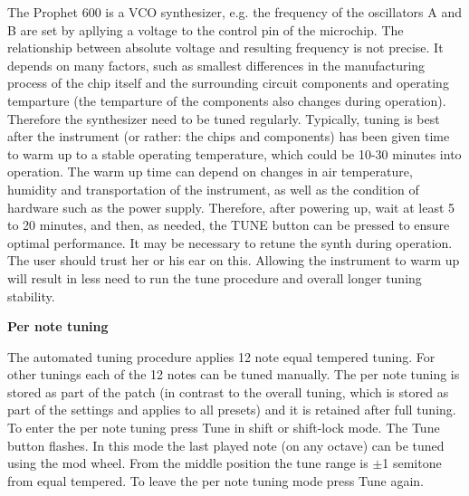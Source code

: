 The Prophet 600 is a VCO synthesizer, e.g. the frequency of the oscillators A and B are set by apllying a voltage to the control pin of the microchip. The relationship between absolute voltage and resulting frequency is not precise. It depends on many factors, such as smallest differences in the manufacturing process of the chip itself and the surrounding circuit components and operating temparture (the temparture of the components also changes during operation). Therefore the synthesizer need to be tuned regularly. Typically, tuning is best after the instrument (or rather: the chips and components) has been given time to warm up to a stable operating temperature, which could be 10-30 minutes into operation. The warm up time can depend on changes in air temperature, humidity and transportation of the instrument, as well as the condition of hardware such as the power supply. Therefore, after powering up, wait at least 5 to 20 minutes, and then, as needed, the TUNE button can be pressed to ensure optimal performance. It may be necessary to retune the synth during operation. The user should trust her or his ear on this. Allowing the instrument to warm up will result in less need to run the tune procedure and overall longer tuning stability.

\textbf{Per note tuning}

The automated tuning procedure applies 12 note equal tempered tuning. For other tunings each of the 12 notes can be tuned manually. The per note tuning is stored as part of the patch (in contrast to the overall tuning, which is stored as part of the settings and applies to all presets) and it is retained after full tuning. To enter the per note tuning press Tune in shift or shift-lock mode. The Tune button flashes. In this mode the last played note (on any octave) can be tuned using the mod wheel. From the middle position the tune range is $\pm$1 semitone from equal tempered. To leave the per note tuning mode press Tune again.
